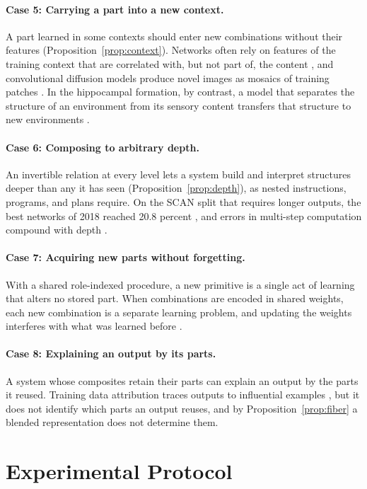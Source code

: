 \documentclass{article}
\theoremstyle{definition}
\theoremstyle{plain}
\theoremstyle{remark}
\begin{document}
\paragraph{Case 5: Carrying a part into a new context.} A part learned
in some contexts should enter new combinations without their features
(Proposition~\ref{prop:context}). Networks often rely on features of the
training context that are correlated with, but not part of, the
content \citep{geirhos2020}, and convolutional diffusion models produce
novel images as mosaics of training patches \citep{kamb2025}. In the
hippocampal formation, by contrast, a model that separates the
structure of an environment from its sensory content transfers that
structure to new environments \citep{whittington2020}.

\paragraph{Case 6: Composing to arbitrary depth.} An invertible
relation at every level lets a system build and interpret structures
deeper than any it has seen (Proposition~\ref{prop:depth}), as nested
instructions, programs, and plans require. On the SCAN split that
requires longer outputs, the best networks of 2018 reached 20.8 percent
\citep{lake2018}, and errors in multi-step computation compound with
depth \citep{dziri2023}.

\paragraph{Case 7: Acquiring new parts without forgetting.} With a
shared role-indexed procedure, a new primitive is a single act of
learning that alters no stored part. When combinations are encoded in
shared weights, each new combination is a separate learning problem,
and updating the weights interferes with what was learned before
\citep{mccloskey1989,french1999}.

\paragraph{Case 8: Explaining an output by its parts.} A system whose
composites retain their parts can explain an output by the parts it
reused. Training data attribution traces outputs to influential
examples \citep{koh2017,grosse2023}, but it does not identify which
parts an output reuses, and by Proposition~\ref{prop:fiber} a blended
representation does not determine them.

\section{Experimental Protocol}
\label{app:protocol}
\end{document}
